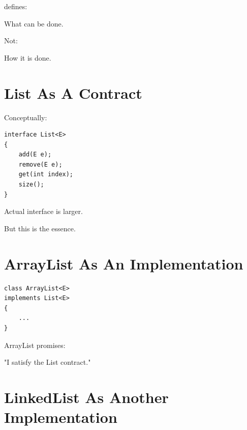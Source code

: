 \documentclass[11pt,a4paper]{book}
\begin{document}

defines:


What can be done.


Not:


How it is done.


\section{List As A Contract}

Conceptually:

\begin{verbatim} 
interface List<E>
{
    add(E e);
    remove(E e);
    get(int index);
    size();
}
\end{verbatim}


Actual interface is larger.


But this is the essence.


\section{ArrayList As An Implementation}

\begin{verbatim} 
class ArrayList<E>
implements List<E>
{
    ...
}
\end{verbatim}


ArrayList promises:


"I satisfy the List contract."


\section{LinkedList As Another Implementation}
\end{document}

